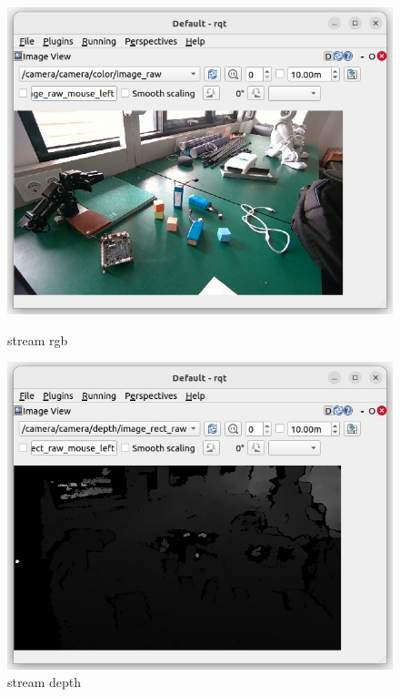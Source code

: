 \begin{figure}[h]
    \centering
    \begin{minipage}{0.48\columnwidth}
        \centering
        \includegraphics[width=\linewidth]{gambar/rgb stream.jpeg}
        \caption{stream rgb}
        \label{fig:rgb_stream}
    \end{minipage}
    \hfill
    \begin{minipage}{0.48\columnwidth}
        \centering
        \includegraphics[width=\linewidth]{gambar/depth stream.jpeg}
        \caption{stream depth}
        \label{fig:depth_stream}
    \end{minipage}
\end{figure}

